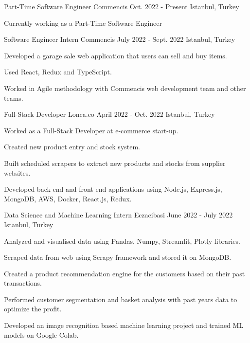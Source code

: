 
\begin{cventries}

  \cventry
    {Part-Time Software Engineer}
    {Commencis}
    {Oct. 2022 - Present}
    {Istanbul, Turkey}
    {
      \begin{cvitems}
        \item {Currently working as a Part-Time Software Engineer}
      \end{cvitems}
    }

  \cventry
    {Software Engineer Intern}
    {Commencis}
    {July 2022 - Sept. 2022}
    {Istanbul, Turkey}
    {
      \begin{cvitems}
        \item {Developed a garage sale web application that users can sell and buy items.}
        \item {Used React, Redux and TypeScript.}
        \item {Worked in Agile methodology with Commencis web development team and other teams.}
      \end{cvitems}
    }

  \cventry
    {Full-Stack Developer}
    {Lonca.co}
    {April 2022 - Oct. 2022}
    {Istanbul, Turkey}
    {
      \begin{cvitems}
        \item {Worked as a Full-Stack Developer at e-commerce start-up.}
        \item {Created new product entry and stock system.}
        \item {Built scheduled scrapers to extract new products and stocks from supplier websites.}
        \item {Developed back-end and front-end applications using Node.js, Express.js, MongoDB, AWS, Docker, React.js, Redux.}
      \end{cvitems}
    }

  \cventry
    {Data Science and Machine Learning Intern}
    {Eczacibasi}
    {June 2022 - July 2022}
    {Istanbul, Turkey}
    {
      \begin{cvitems}
        \item {Analyzed and visualised data using Pandas, Numpy, Streamlit, Plotly libraries.}
        \item {Scraped data from web using Scrapy framework and stored it on MongoDB.}
        \item {Created a product recommendation engine for the customers based on their past transactions.}
        \item {Performed customer segmentation and basket analysis with past years data to optimize the profit.}
        \item {Developed an image recognition based machine learning project and trained ML models on Google Colab.}
      \end{cvitems}
    }


\end{cventries}
